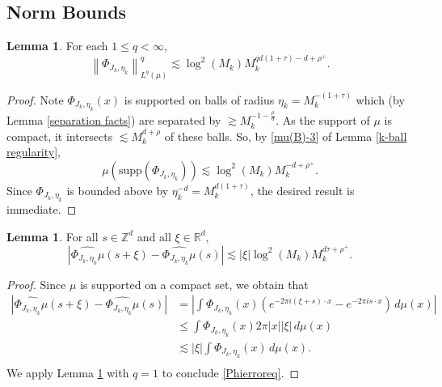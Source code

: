 \documentclass{amsart}
\numberwithin{equation}{section}
\theoremstyle{definition}
\newtheorem{lemma}[theorem]{Lemma}
\theoremstyle{definition}
\def\RR{\mathbb{R}}
\def\ZZ{\mathbb{Z}}
\def\supp{\mathrm{supp}}
\newcommand{\rbr}[1]{\left( {#1} \right)}
\newcommand{\norm}[1]{\left\|#1\right\|}
\begin{document}
\subsection{Norm  Bounds}\label{norm bounds}


\begin{lemma}\label{PhiLqnorm}
For each $1 \leq q < \infty$, 
$$
\norm{\Phi_{J_k, \eta_k}}_{L^q(\mu)}^q
\lesssim 
\log^2(M_k) M_k^{qd(1 + \tau) - d + \rho^+}.
$$
\end{lemma}
\begin{proof}
Note $\Phi_{J_k, \eta_k}(x)$ is supported on balls of radius $\eta_k = M_k^{-(1+\tau)}$ which 
(by Lemma \ref{separation facts}) are separated by $\gtrsim M_k^{-1-\frac{\rho}{d}}$. 
As the support of $\mu$ is compact, it intersects $\lesssim M_{k}^{d+\rho}$ of these balls. 
So, by \eqref{mu(B)-3} of Lemma \ref{k-ball regularity}, 
$$
\mu\rbr{\supp\rbr{\Phi_{J_k, \eta_k}}}
\lesssim 
\log^2(M_k)M_{k}^{-d+\rho^+}. 
$$
Since $\Phi_{J_k, \eta_k}$ is bounded above by $\eta_k^{-d} = M_k^{d(1 + \tau)}$, 
the desired result is immediate. 
\end{proof}

\begin{lemma}\label{Phierrorlem}
For all $s \in \ZZ^d$ and all $\xi \in \RR
^d$, 
\begin{equation}\label{Phierroreq}
\left| \widehat{\Phi_{J_k, \eta_k} \mu}(s + \xi) - \widehat{\Phi_{J_k, \eta_k} \mu}(s) \right| \lesssim |\xi| \log^2(M_k) 
M_k^{d \tau+\rho^+}. 
\end{equation}
\end{lemma}
\begin{proof}
Since $\mu$ is supported on 
a compact set, 
we obtain that
\begin{align*}
\left| \widehat{\Phi_{J_k, \eta_k} \mu}(s + \xi) - \widehat{\Phi_{J_k, \eta_k} \mu}(s) \right| & = \left| \int \Phi_{J_k, \eta_k}(x) \left(e^{-2 \pi i (\xi + s) \cdot x} - e^{-2 \pi i s \cdot x} \right) \, d \mu(x) \right|  \\
& \leq \int \Phi_{J_k, \eta_k}(x) 2 \pi |x| |\xi| \, d \mu(x) \\
& \lesssim |\xi| \int \Phi_{J_k, \eta_k}(x) \, d \mu(x). \\
\end{align*}
We apply Lemma \ref{PhiLqnorm} with $q = 1$ to conclude \eqref{Phierroreq}.
\end{proof}
\end{document}

